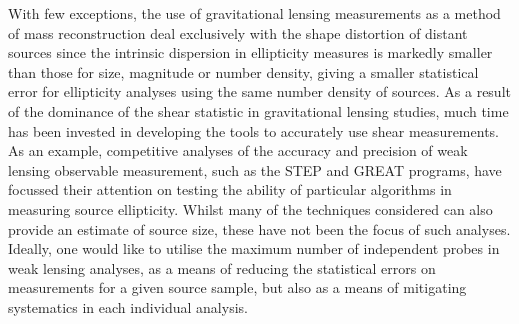 \documentclass[useAMS,usenatbib,times,letter,amssymb]{mn2e}
\begin{document}

With few exceptions, the use of gravitational lensing measurements as a method of mass reconstruction deal exclusively with the shape distortion of distant sources since the intrinsic dispersion in ellipticity measures is markedly smaller than those for size, magnitude or number density, giving a smaller statistical error for ellipticity analyses using the same number density of sources. As a result of the dominance of the shear statistic in gravitational lensing studies, much time has been invested in developing the tools to accurately use shear measurements. As an example, competitive analyses of the accuracy and precision of weak lensing observable measurement, such as the STEP and GREAT programs, have focussed their attention on testing the ability of particular algorithms in measuring source ellipticity. Whilst many of the techniques considered can also provide an estimate of source size, these have not been the focus of such analyses. Ideally, one would like to utilise the maximum number of independent probes in weak lensing analyses, as a means of reducing the statistical errors on measurements for a given source sample, but also as a means of mitigating systematics in each individual analysis. %
\end{document}

